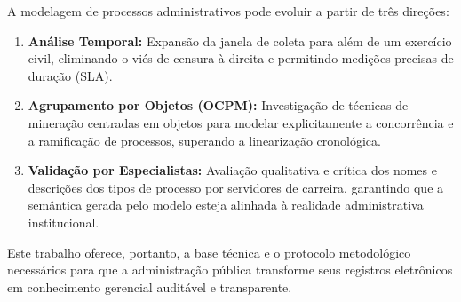 A modelagem de processos administrativos pode evoluir a partir de três direções:
\begin{enumerate}
    \item \textbf{Análise Temporal:} Expansão da janela de coleta para além de um exercício civil, eliminando o viés de censura à direita e permitindo medições precisas de duração (SLA).
    \item \textbf{Agrupamento por Objetos (OCPM):} Investigação de técnicas de mineração centradas em objetos para modelar explicitamente a concorrência e a ramificação de processos, superando a linearização cronológica.
    \item \textbf{Validação por Especialistas:} Avaliação qualitativa e crítica dos nomes e descrições dos tipos de processo por servidores de carreira, garantindo que a semântica gerada pelo modelo esteja alinhada à realidade administrativa institucional.
\end{enumerate}

Este trabalho oferece, portanto, a base técnica e o protocolo metodológico necessários para que a administração pública transforme seus registros eletrônicos em conhecimento gerencial auditável e transparente.